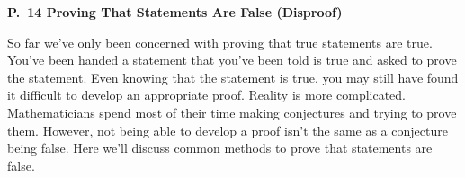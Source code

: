 \documentclass[12 pt]{article}
\theoremstyle{definition}
\theoremstyle{plain}
\theoremstyle{mytheorem}
\theoremstyle{myexample}
\theoremstyle{mydefinition}
\begin{document}
\begin{center}
\textbf{P.~14 Proving That Statements Are False (Disproof)}
\end{center}

So far we've only been concerned with proving that true statements are true.  You've been handed a statement that you've been told is true and asked to prove the statement.  Even knowing that the statement is true, you may still have found it difficult to develop an appropriate proof.  Reality is more complicated.  Mathematicians spend most of their time making conjectures and trying to prove them.  However, not being able to develop a proof isn't the same as a conjecture being false.  Here we'll discuss common methods to prove that statements are false.

% 	

\begin{center}
\end{center}
\end{document}

